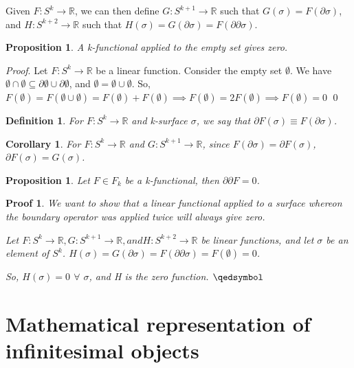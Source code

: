 \documentclass{book}
\newtheorem{defn}[equation]{Definition}
\newtheorem{coro}[equation]{Corollary}
\newtheorem{prop}[equation]{Proposition}
\newtheorem{prf}[equation]{Proof}
\renewenvironment{proof}{\emph{Proof}.}{\qed}
\begin{document}
Given $F : S^k \to \mathbb{R}$, we can then define $G : S^{k+1} \to \mathbb{R}$ such that $G(\sigma) = F(\partial\sigma)$, and $H : S^{k+2} \to \mathbb{R}$ such that $H(\sigma) = G(\partial\sigma) = F(\partial\partial\sigma)$. 

\begin{prop}
	A k-functional applied to the empty set gives zero. 
\end{prop}
\begin{proof}
	Let $F : S^k \to \mathbb{R}$ be a linear function. Consider the empty set $\emptyset$. 
We have $\emptyset \cap \emptyset \subseteq \partial\emptyset \cup \partial\emptyset$, and $\emptyset = \emptyset\cup\emptyset$. 
So, $F(\emptyset) = F(\emptyset\cup\emptyset) = F(\emptyset) + F(\emptyset) \implies F(\emptyset) = 2F(\emptyset) \implies F(\emptyset) = 0$
\end{proof}


\begin{defn}
	For $F : S^k \to \mathbb{R}$ and k-surface $\sigma$, we say that $\partial F(\sigma) \equiv F(\partial\sigma)$. 
\end{defn}

\begin{coro}
	For $F : S^k \to \mathbb{R}$ and $G : S^{k+1} \to \mathbb{R}$, since $F(\partial\sigma) = \partial F(\sigma)$, $\partial F(\sigma) = G(\sigma)$. 
\end{coro}

\begin{prop}
	Let $F \in F_k$ be a k-functional, then $\partial\partial F = 0 $.
\end{prop}
\begin{prf}
	We want to show that a linear functional applied to a surface whereon the boundary operator was applied twice will always give zero.
	
	Let $F : S^k \to \mathbb{R}, G : S^{k+1} \to \mathbb{R}, and H : S^{k+2} \to \mathbb{R}$ be linear functions, and let $\sigma$ be an element of $S^k$. $H(\sigma) = G(\partial\sigma) = F(\partial\partial\sigma) = F(\emptyset) = 0$. 
	
	So, $H(\sigma) = 0$ $\forall$ $\sigma$, and H is the zero function. 
	$\qedsymbol$
\end{prf}






\chapter{Mathematical representation of infinitesimal objects}
\end{document}

